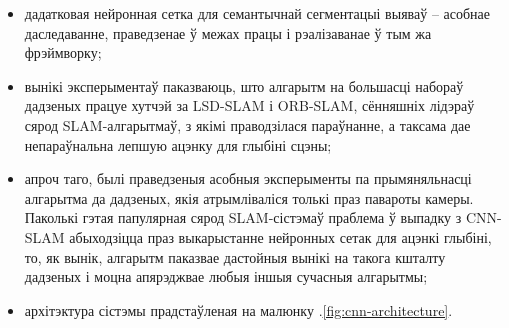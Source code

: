 \begin{itemize}
    \item дадатковая нейронная сетка для семантычнай сегментацыі выяваў -- асобнае даследаванне,
    праведзенае ў межах працы і рэалізаванае ў тым жа фрэймворку;
    \item вынікі эксперыментаў паказваюць, што алгарытм на большасці набораў дадзеных працуе
    хутчэй за LSD-SLAM і ORB-SLAM, сённяшніх лідэраў сярод SLAM-алгарытмаў,
    з якімі праводзілася параўнанне, а таксама дае непараўнальна лепшую ацэнку для глыбіні сцэны;
    \item апроч таго, былі праведзеныя асобныя эксперыменты па прымяняльнасці алгарытма да
    дадзеных, якія атрымліваліся толькі праз павароты камеры. Паколькі гэтая папулярная сярод
    SLAM-сістэмаў праблема ў выпадку з CNN-SLAM абыходзіцца праз выкарыстанне нейронных сетак
    для ацэнкі глыбіні, то, як вынік, алгарытм паказвае дастойныя вынікі на такога кшталту дадзеных
    і моцна апярэджвае любыя іншыя сучасныя алгарытмы;
    \item архітэктура сістэмы прадстаўленая на малюнку \cursection.\ref{fig:cnn-architecture}.
\end{itemize}

\newpage
